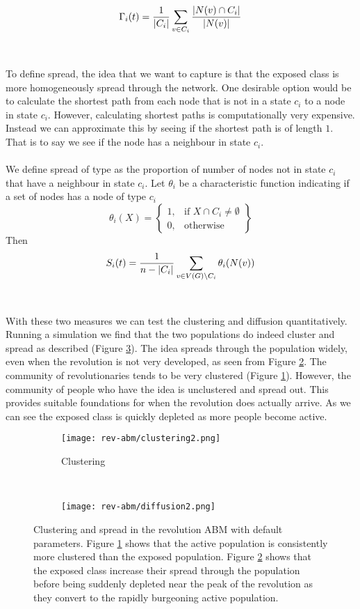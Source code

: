 \[\Gamma_i(t)=\frac{1}{\lvert C_i\rvert}\sum_{v\in C_i}\frac{\lvert N(v)\cap C_i\rvert}{\lvert N(v)\rvert}\]
\\
\\
To define spread, the idea that we want to capture is that the exposed class is more homogeneously spread through the network. One desirable option would be to calculate the shortest path from each node that is not in a state $c_i$ to a node in state $c_i$. However, calculating shortest paths is computationally very expensive. Instead we can approximate this by seeing if the shortest path is of length $1$. That is to say we see if the node has a neighbour in state $c_i$.\\
\\
We define spread of type as the proportion of number of nodes not in state $c_i$ that have a neighbour in state $c_i$. Let $\theta_i$ be a characteristic function indicating if a set of nodes has a node of type $c_i$
\[\theta_i(X)= \left\{\begin{array}{lr}
1, & \text{if } X\cap C_i\neq\emptyset\\
0, & \text{otherwise}
\end{array}\right\}\]
Then
\[S_i(t)=\frac{1}{n-\lvert C_i\rvert}\sum_{v\in V(G)\setminus C_i} \theta_i(N(v)) \]
\\
\\
With these two measures we can test the clustering and diffusion quantitatively. Running a simulation we find that the two populations do indeed cluster and spread as described (Figure \ref{fig:clustering-diffusion-rev-abm}). The idea spreads through the population widely, even when the revolution is not very developed, as seen from Figure \ref{fig:diffusion-rev-abm}. The community of revolutionaries tends to be very clustered (Figure \ref{fig:clustering-rev-abm}). However, the community of people who have the idea is unclustered and spread out. This provides suitable foundations for when the revolution does actually arrive. As we can see the exposed class is quickly depleted as more people become active.
\begin{figure}
	\centering
	\begin{subfigure}{\textwidth}
		\centering
		\texttt{[image: rev-abm/clustering2.png]}
		\caption{Clustering}
		\label{fig:clustering-rev-abm}
	\end{subfigure}%
\\
	\begin{subfigure}{\textwidth}
		\centering
		\texttt{[image: rev-abm/diffusion2.png]}
		\caption{}
		\label{fig:diffusion-rev-abm}
	\end{subfigure}
	\caption{Clustering and spread in the revolution ABM with default parameters. Figure \ref{fig:clustering-rev-abm} shows that the active population is consistently more clustered than the exposed population. Figure \ref{fig:diffusion-rev-abm} shows that the exposed class increase their spread through the population before being suddenly depleted near the peak of the revolution as they convert to the rapidly burgeoning active population.\label{mmd}}
	\label{fig:clustering-diffusion-rev-abm}
\end{figure}

